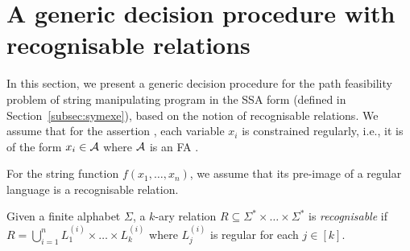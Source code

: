 

\section{A generic decision procedure with recognisable relations} \label{sec:algo}

In this section,  we present a generic decision procedure for the path feasibility problem %
of string manipulating program in the SSA form (defined in Section~\ref{subsec:symexe}), 
based on the notion of recognisable relations. We assume that for the assertion , each variable $x_i$ is constrained regularly, i.e., it is of the form $x_i \in \mathcal{A}$ where $\mathcal{A}$ is an FA .  

%
%

For the string function $f(x_1,\ldots,x_n)$, we assume that its pre-image of a regular language is a recognisable relation.  

\begin{definition}
	Given a finite alphabet $\Sigma$, a $k$-ary relation $R\subseteq \Sigma^*\times \ldots\times \Sigma^*$ is \emph{recognisable}  if $R=\bigcup_{i=1}^n L^{(i)}_1\times \ldots\times L^{(i)}_k$ where $L^{(i)}_j$ is regular for each $j\in [k]$.
%
\end{definition}


